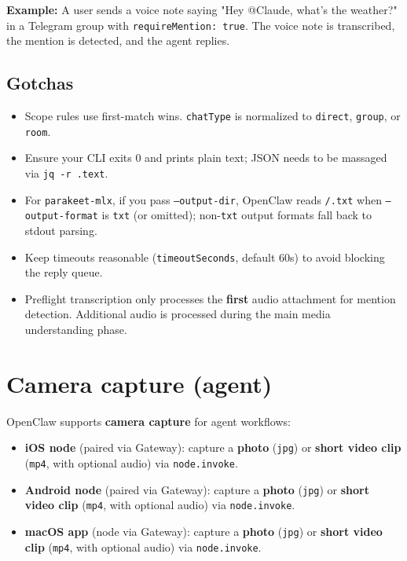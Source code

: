 \textbf{Example:} A user sends a voice note saying "Hey @Claude, what's the weather?" in a Telegram group with \texttt{requireMention: true}. The voice note is transcribed, the mention is detected, and the agent replies.

\subsection{Gotchas}


\begin{itemize}
  \item Scope rules use first-match wins. \texttt{chatType} is normalized to \texttt{direct}, \texttt{group}, or \texttt{room}.
  \item Ensure your CLI exits 0 and prints plain text; JSON needs to be massaged via \texttt{jq -r .text}.
  \item For \texttt{parakeet-mlx}, if you pass \texttt{--output-dir}, OpenClaw reads \texttt{/.txt} when \texttt{--output-format} is \texttt{txt} (or omitted); non-\texttt{txt} output formats fall back to stdout parsing.
  \item Keep timeouts reasonable (\texttt{timeoutSeconds}, default 60s) to avoid blocking the reply queue.
  \item Preflight transcription only processes the \textbf{first} audio attachment for mention detection. Additional audio is processed during the main media understanding phase.
\end{itemize}



\clearpage

\section{Camera capture (agent)}


OpenClaw supports \textbf{camera capture} for agent workflows:

\begin{itemize}
  \item \textbf{iOS node} (paired via Gateway): capture a \textbf{photo} (\texttt{jpg}) or \textbf{short video clip} (\texttt{mp4}, with optional audio) via \texttt{node.invoke}.
  \item \textbf{Android node} (paired via Gateway): capture a \textbf{photo} (\texttt{jpg}) or \textbf{short video clip} (\texttt{mp4}, with optional audio) via \texttt{node.invoke}.
  \item \textbf{macOS app} (node via Gateway): capture a \textbf{photo} (\texttt{jpg}) or \textbf{short video clip} (\texttt{mp4}, with optional audio) via \texttt{node.invoke}.
\end{itemize}


